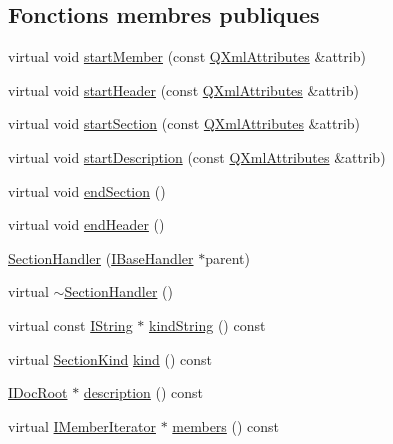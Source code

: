 \subsection*{Fonctions membres publiques}
\begin{DoxyCompactItemize}
\item 
virtual void \hyperlink{class_section_handler_a374859f7b4173fc7235f44a7693bbc84}{start\+Member} (const \hyperlink{class_q_xml_attributes}{Q\+Xml\+Attributes} \&attrib)
\item 
virtual void \hyperlink{class_section_handler_a73659b9a7ce539c23823063f4e9c45c7}{start\+Header} (const \hyperlink{class_q_xml_attributes}{Q\+Xml\+Attributes} \&attrib)
\item 
virtual void \hyperlink{class_section_handler_a4bda4ed37671bca76ea6daaee5e547e7}{start\+Section} (const \hyperlink{class_q_xml_attributes}{Q\+Xml\+Attributes} \&attrib)
\item 
virtual void \hyperlink{class_section_handler_a5e29cb4d5c08687775be196114fc4e77}{start\+Description} (const \hyperlink{class_q_xml_attributes}{Q\+Xml\+Attributes} \&attrib)
\item 
virtual void \hyperlink{class_section_handler_a0a5405315b9ae91a7f69cb1b20cd3432}{end\+Section} ()
\item 
virtual void \hyperlink{class_section_handler_ae04c5b7b1759156aa51ac0e6a040b86d}{end\+Header} ()
\item 
\hyperlink{class_section_handler_a5cf144be479a68bd12a6ccfc3d102583}{Section\+Handler} (\hyperlink{class_i_base_handler}{I\+Base\+Handler} $\ast$parent)
\item 
virtual \hyperlink{class_section_handler_ab8d6d9d4f7a30b946b3613431567a09f}{$\sim$\+Section\+Handler} ()
\item 
virtual const \hyperlink{class_i_string}{I\+String} $\ast$ \hyperlink{class_section_handler_adccefd5b15916d21d01d2b9ac0d93418}{kind\+String} () const 
\item 
virtual \hyperlink{class_i_section_af768cbfe7056fadbd0a67d26d0ef84e5}{Section\+Kind} \hyperlink{class_section_handler_a8cb80e96b63623ef8f1178f4e436f61f}{kind} () const 
\item 
\hyperlink{class_i_doc_root}{I\+Doc\+Root} $\ast$ \hyperlink{class_section_handler_a8927564219547e0631e741b148769bb5}{description} () const 
\item 
virtual \hyperlink{class_i_member_iterator}{I\+Member\+Iterator} $\ast$ \hyperlink{class_section_handler_a1c52992233ad59fef3ebca9741847e6a}{members} () const 
\item 

\end{DoxyCompactItemize}
